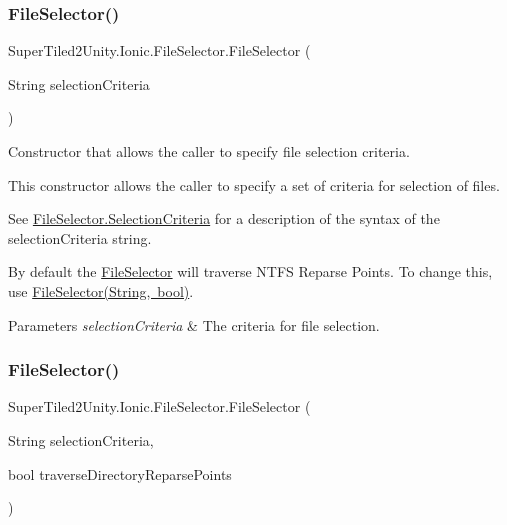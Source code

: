 \subsubsection{\texorpdfstring{File\+Selector()}{FileSelector()}\hspace{0.1cm}{\footnotesize\ttfamily [1/2]}}
{\footnotesize\ttfamily Super\+Tiled2\+Unity.\+Ionic.\+File\+Selector.\+File\+Selector (\begin{DoxyParamCaption}\item[{String}]{selection\+Criteria }\end{DoxyParamCaption})}



Constructor that allows the caller to specify file selection criteria. 

This constructor allows the caller to specify a set of criteria for selection of files. 

See \mbox{\hyperlink{class_super_tiled2_unity_1_1_ionic_1_1_file_selector_a0f2d26f8fb39862f504bc0069365ff39}{File\+Selector.\+Selection\+Criteria}} for a description of the syntax of the selection\+Criteria string. 

By default the \mbox{\hyperlink{class_super_tiled2_unity_1_1_ionic_1_1_file_selector}{File\+Selector}} will traverse N\+T\+FS Reparse Points. To change this, use \mbox{\hyperlink{class_super_tiled2_unity_1_1_ionic_1_1_file_selector_a3c48fb07f40c9390505395257fee90cf}{File\+Selector(\+String, bool)}}. 


\begin{DoxyParams}{Parameters}
{\em selection\+Criteria} & The criteria for file selection.\\
\hline
\end{DoxyParams}
\mbox{\label{class_super_tiled2_unity_1_1_ionic_1_1_file_selector_a3c48fb07f40c9390505395257fee90cf}} 
\subsubsection{\texorpdfstring{File\+Selector()}{FileSelector()}\hspace{0.1cm}{\footnotesize\ttfamily [2/2]}}
{\footnotesize\ttfamily Super\+Tiled2\+Unity.\+Ionic.\+File\+Selector.\+File\+Selector (\begin{DoxyParamCaption}\item[{String}]{selection\+Criteria,  }\item[{bool}]{traverse\+Directory\+Reparse\+Points }\end{DoxyParamCaption})}




